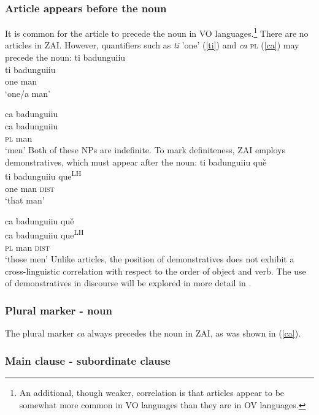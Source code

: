 \subsubsection{Article appears before the noun}

It is common for the article to precede the noun in VO languages.\footnote{An additional, though weaker, correlation is that articles appear to be somewhat more common in VO languages than they are in OV languages.} There are no articles in ZAI. However, quantifiers such as \textit{ti} 'one' (\ref{ti}) and \textit{ca} \textsc{pl} (\ref{ca}) may precede the noun:
\ea\label{ti}
\glll ti badunguiiu \\
ti badunguiiu \\
one man \\
\glt `one/a man'

\z

\ea\label{ca}
\glll ca badunguiiu \\
ca badunguiiu \\
\textsc{pl} man \\
\glt `men'
\z
Both of these NPs are indefinite. To mark definiteness, ZAI employs demonstratives, which must appear after the noun:
\ea\label{ti2}
\glll ti badunguiiu qu\v{e} \\
ti badunguiiu que\textsuperscript{LH} \\
one man \textsc{dist} \\
\glt `that man'
\z

\ea\label{ca2}
\glll ca badunguiiu qu\v{e} \\
ca badunguiiu que\textsuperscript{LH} \\
\textsc{pl} man \textsc{dist} \\
\glt `those men'
\z
Unlike articles, the position of demonstratives does not exhibit a cross-linguistic correlation with respect to the order of object and verb. The use of demonstratives in discourse will be explored in more detail in .


\subsubsection{Plural marker - noun}

The plural marker \textit{ca} always precedes the noun in ZAI, as was shown in (\ref{ca}). 


\subsubsection{Main clause - subordinate clause}

